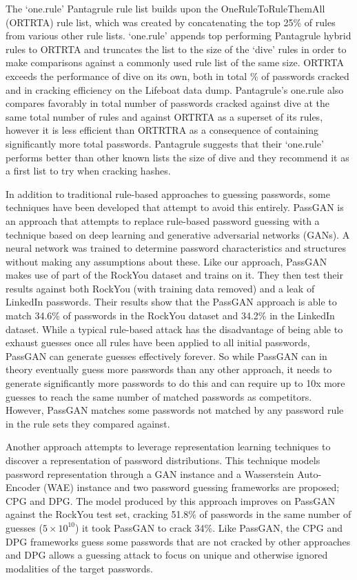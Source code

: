 \documentclass[letterpaper,twocolumn,10pt]{article}
\begin{document}
The `one.rule' Pantagrule rule list builds upon the OneRuleToRuleThemAll
(ORTRTA) rule list\cite{ortrta}, which was created by concatenating the top
25\% of rules from various other rule lists. `one.rule' appends top performing
Pantagrule hybrid rules to ORTRTA and truncates the list to the size of
the `dive' rules in order to make comparisons against a commonly used rule list
of the same size. ORTRTA exceeds the performance of dive on its own, both in
total \% of passwords cracked and in cracking efficiency on the Lifeboat data
dump. Pantagrule's one.rule also compares favorably in total number of passwords
cracked against dive at the same total number of rules and against ORTRTA as a
superset of its rules, however it is less efficient than ORTRTRA as a
consequence of containing significantly more total passwords. Pantagrule
suggests that their `one.rule' performs better than other known lists the size
of dive and they recommend it as a first list to try when cracking hashes.


In addition to traditional rule-based approaches to guessing passwords, some
techniques have been developed that attempt to avoid this entirely.
PassGAN\cite{hitaj2019passgan} is an approach that attempts to replace
rule-based password guessing with a technique based on deep learning and
generative adversarial networks (GANs). A neural network was
trained to determine password characteristics and structures without making any
assumptions about these. Like our approach, PassGAN makes use of part of the
RockYou dataset and trains on it. They then test their results against both
RockYou (with training data removed) and a leak of LinkedIn passwords. Their
results show that the PassGAN approach is able to match 34.6\% of passwords in
the RockYou dataset and 34.2\% in the LinkedIn dataset. While a typical
rule-based attack has the disadvantage of being able to exhaust guesses once
all rules have been applied to all initial passwords, PassGAN can generate
guesses effectively forever. So while PassGAN can in theory eventually guess
more passwords than any other approach, it needs to generate significantly more
passwords to do this and can require up to 10x more guesses to reach the same
number of matched passwords as competitors. However, PassGAN matches some
passwords
not matched by any password rule in the rule sets they compared against.

Another approach\cite{pasquini2021improving} attempts to leverage
representation learning techniques to discover a representation of password
distributions. This technique models password representation through a GAN
instance and a Wasserstein Auto-Encoder (WAE) instance and two password guessing
frameworks are proposed; CPG and DPG. The model produced by this approach
improves on PassGAN against the RockYou test set, cracking 51.8\% of passwords
in the same number of guesses ($5 \times 10^{10}$) it took PassGAN to crack 34\%.
Like PassGAN, the CPG and DPG frameworks guess some passwords that are not
cracked by other approaches and DPG allows a guessing attack to focus on unique
and otherwise ignored modalities of the target passwords.
\end{document}
